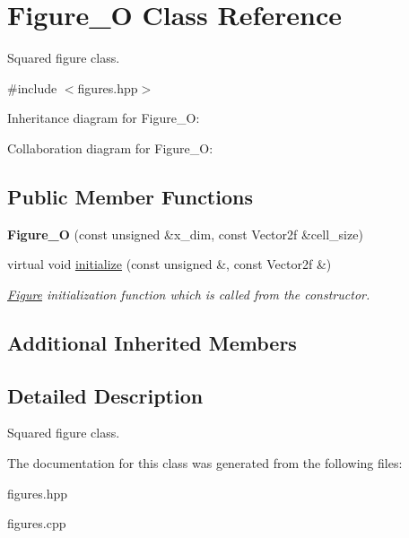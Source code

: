 \hypertarget{classFigure__O}{}\section{Figure\+\_\+O Class Reference}
\label{classFigure__O}


Squared figure class.  




{\ttfamily \#include $<$figures.\+hpp$>$}



Inheritance diagram for Figure\+\_\+O\+:


Collaboration diagram for Figure\+\_\+O\+:
\subsection*{Public Member Functions}
\begin{DoxyCompactItemize}
\item 
\mbox{\label{classFigure__O_ae42cdbed4bb0069d3029149666433b69}} 
{\bfseries Figure\+\_\+O} (const unsigned \&x\+\_\+dim, const Vector2f \&cell\+\_\+size)
\item 
\mbox{\label{classFigure__O_a384e22b22e7d4add3d50c57d44fff4f9}} 
virtual void \hyperlink{classFigure__O_a384e22b22e7d4add3d50c57d44fff4f9}{initialize} (const unsigned \&, const Vector2f \&)
\begin{DoxyCompactList}\small\item\em \hyperlink{classFigure}{Figure} initialization function which is called from the constructor. \end{DoxyCompactList}\end{DoxyCompactItemize}
\subsection*{Additional Inherited Members}


\subsection{Detailed Description}
Squared figure class. 

The documentation for this class was generated from the following files\+:\begin{DoxyCompactItemize}
\item 
figures.\+hpp\item 
figures.\+cpp\end{DoxyCompactItemize}
